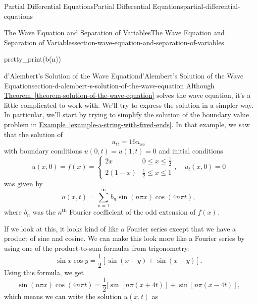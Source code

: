 \documentclass[oneside,10pt,]{book}
\numberwithin{equation}{section}
\renewcommand{\th}{\text{th}}
\newcommand{\amp}{&}
\begin{document}
\begin{chapterptx}{Partial Differential Equations}{}{Partial Differential Equations}{}{}{partial-differential-equations}
\begin{sectionptx}{The Wave Equation and Separation of Variables}{}{The Wave Equation and Separation of Variables}{}{}{section-wave-equation-and-separation-of-variables}
\begin{sageinput}
pretty_print(b(n))
\end{sageinput}
\end{sectionptx}
%
%
\typeout{************************************************}
\typeout{************************************************}
%
\begin{sectionptx}{d'Alembert's Solution of the Wave Equation}{}{d'Alembert's Solution of the Wave Equation}{}{}{section-d-alembert-s-solution-of-the-wave-equation}
\hypertarget{p-669}{}%
Although \hyperref[theorem-solution-of-the-wave-equation]{Theorem~\ref{theorem-solution-of-the-wave-equation}} solves the wave equation, it's a little complicated to work with. We'll try to express the solution in a simpler way. In particular, we'll start by trying to simplify the solution of the boundary value problem in \hyperref[example-a-string-with-fixed-ends]{Example~\ref{example-a-string-with-fixed-ends}}. In that example, we saw that the solution of%
\begin{equation*}
u_{tt} = 16u_{xx}
\end{equation*}
with boundary conditions \(u(0,t) = u(1,t) = 0\) and initial conditions%
\begin{equation*}
u(x,0) = f(x) = \begin{cases} 2x \amp 0\leq x\leq \frac{1}{2} \\ 2(1-x) \amp \frac{1}{2}\leq x\leq 1 \end{cases},\quad u_{t}(x,0) = 0
\end{equation*}
was given by%
\begin{equation*}
u(x,t) = \sum_{n=1}^{\infty}b_{n}\sin(n\pi x)\cos(4n\pi t),
\end{equation*}
where \(b_{n}\) was the \(n^{\th}\) Fourier coefficient of the odd extension of \(f(x)\).%
\par
\hypertarget{p-670}{}%
If we look at this, it looks kind of like a Fourier series except that we have a product of sine and cosine. We can make this look more like a Fourier series by using one of the product-to-sum formulas from trigonometry:%
%
\begin{equation*}
\sin x\cos y = \frac{1}{2}[\sin(x+y)+\sin(x-y)].
\end{equation*}
\hypertarget{p-671}{}%
Using this formula, we get%
\begin{equation*}
\sin(n\pi x)\cos(4n\pi t) = \frac{1}{2}[\sin[n\pi(x+4t)]+\sin[n\pi(x-4t)],
\end{equation*}
which means we can write the solution \(u(x,t)\) as%

\end{sectionptx}
\end{chapterptx}
\end{document}
